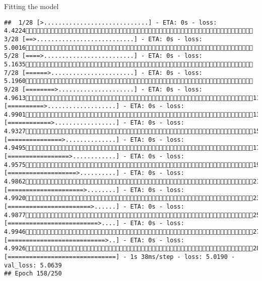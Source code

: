 \documentclass[
  ignorenonframetext,
]{beamer}
\begin{document}
\begin{frame}[fragile]{Fitting the model}
\begin{verbatim}
##  1/28 [>.............................] - ETA: 0s - loss: 4.4224 3/28 [==>...........................] - ETA: 0s - loss: 5.0016 5/28 [====>.........................] - ETA: 0s - loss: 5.1635 7/28 [======>.......................] - ETA: 0s - loss: 5.1960 9/28 [========>.....................] - ETA: 0s - loss: 4.961311/28 [==========>...................] - ETA: 0s - loss: 4.990113/28 [============>.................] - ETA: 0s - loss: 4.932715/28 [===============>..............] - ETA: 0s - loss: 4.949517/28 [=================>............] - ETA: 0s - loss: 4.957519/28 [===================>..........] - ETA: 0s - loss: 4.986221/28 [=====================>........] - ETA: 0s - loss: 4.992023/28 [=======================>......] - ETA: 0s - loss: 4.987725/28 [=========================>....] - ETA: 0s - loss: 4.994627/28 [===========================>..] - ETA: 0s - loss: 4.992628/28 [==============================] - 1s 38ms/step - loss: 5.0190 - val_loss: 5.0639
## Epoch 158/250

\end{verbatim}
\end{frame}
\end{document}
